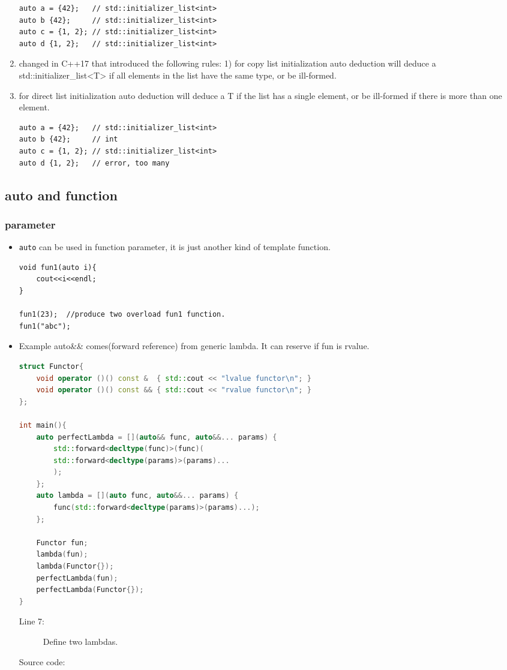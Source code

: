 \documentclass[a4paper,11pt,twoside]{book}
\begin{document}
\begin{enumerate}
\begin{lstlisting}[numbers=none]
auto a = {42};   // std::initializer_list<int>
auto b {42};     // std::initializer_list<int>
auto c = {1, 2}; // std::initializer_list<int>
auto d {1, 2};   // std::initializer_list<int>
\end{lstlisting}
		\item  changed in C++17 that introduced the following rules: 1) for copy list initialization auto deduction will deduce a std::initializer\_list<T> if all elements in the list have the same type, or be ill-formed.
		\item for direct list initialization auto deduction will deduce a T if the list has a single element, or be ill-formed if there is more than one element.
\begin{lstlisting}[numbers=none]
auto a = {42};   // std::initializer_list<int>
auto b {42};     // int
auto c = {1, 2}; // std::initializer_list<int>
auto d {1, 2};   // error, too many 
\end{lstlisting}
	\end{enumerate}

\subsection{auto and function}

\subsubsection{parameter}
\begin{itemize}
\item \texttt{auto} can be used in function parameter, it is just another kind of template function.
\begin{lstlisting}[numbers=none]
void fun1(auto i){
	cout<<i<<endl;
}

fun1(23);  //produce two overload fun1 function.
fun1("abc");
\end{lstlisting}

\item Example auto\&\& comes(forward reference) from generic lambda. It can reserve if fun is rvalue.
\begin{lstlisting}[frame=single, language=c++]
struct Functor{
	void operator ()() const &  { std::cout << "lvalue functor\n"; }
	void operator ()() const && { std::cout << "rvalue functor\n"; }
};

int main(){
	auto perfectLambda = [](auto&& func, auto&&... params) {
		std::forward<decltype(func)>(func)(
		std::forward<decltype(params)>(params)...
		);
	};
	auto lambda = [](auto func, auto&&... params) {
		func(std::forward<decltype(params)>(params)...);
	};

	Functor fun;
	lambda(fun);
	lambda(Functor{});
	perfectLambda(fun);
	perfectLambda(Functor{});
}
\end{lstlisting}
\begin{description}
	\item[Line 7:] Define two lambdas.
	\item[Source code:]
\end{description}
\end{itemize}
\end{document}

